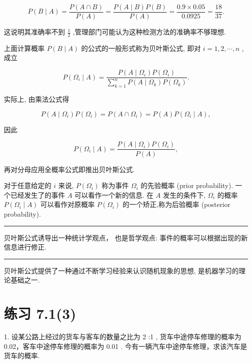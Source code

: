 \documentclass[10pt]{article}
\newcommand{\HRule}{\begin{center}\rule{0.9\linewidth}{0.2mm}\end{center}}
\begin{document}
\[
P\left( {B \mid  A}\right)  = \frac{P\left( {A \cap  B}\right) }{P\left( A\right) } = \frac{P\left( {A \mid  B}\right) P\left( B\right) }{P\left( A\right) } = \frac{{0.9} \times  {0.05}}{0.0925} = \frac{18}{37}.
\]

这说明其准确率不到 \(\frac{1}{2}\) ,管理部门可能认为这种检测方法的准确率不够理想.





上面计算概率 \(P\left( {B \mid  A}\right)\) 的公式的一般形式称为贝叶斯公式, 即对 \(i = 1,2,\cdots ,n\) ,成立

\[
P\left( {{\Omega }_{i} \mid  A}\right)  = \frac{P\left( {A \mid  {\Omega }_{i}}\right) P\left( {\Omega }_{i}\right) }{\mathop{\sum }\limits_{{k = 1}}^{n}P\left( {A \mid  {\Omega }_{k}}\right) P\left( {\Omega }_{k}\right) }.
\]

实际上, 由乘法公式得

\[
P\left( {A \mid  {\Omega }_{i}}\right) P\left( {\Omega }_{i}\right)  = P\left( {A \cap  {\Omega }_{i}}\right)  = P\left( A\right) P\left( {{\Omega }_{i} \mid  A}\right) ,
\]

因此

\[
P\left( {{\Omega }_{i} \mid  A}\right)  = \frac{P\left( {A \mid  {\Omega }_{i}}\right) P\left( {\Omega }_{i}\right) }{P\left( A\right) },
\]

再对分母应用全概率公式即推出贝叶斯公式.

对于任意给定的 \(i\) 来说, \(P\left( {\Omega }_{i}\right)\) 称为事件 \({\Omega }_{i}\) 的先验概率 (prior probability). 一个已经发生了的事件 \(A\) 可以看作一个新的信息. 在 \(A\) 发生的条件下, \({\Omega }_{i}\) 的概率 \(P\left( {{\Omega }_{i} \mid  A}\right)\) 可以看作对原概率 \(P\left( {\Omega }_{i}\right)\) 的一个矫正,称为后验概率 (posterior probability).

\HRule

贝叶斯公式诱导出一种统计学观点， 也是哲学观点: 事件的概率可以根据出现的新信息进行修正.

\HRule

贝叶斯公式提供了一种通过不断学习经验来认识随机现象的思想, 是机器学习的理论基础之一.

\section*{练习 7.1(3)}

1. 设某公路上经过的货车与客车的数量之比为 2 :1 , 货车中途停车修理的概率为 0.02，客车中途停车修理的概率为 0.01 . 今有一辆汽车中途停车修理，求该汽车是货车的概率.
\end{document}
